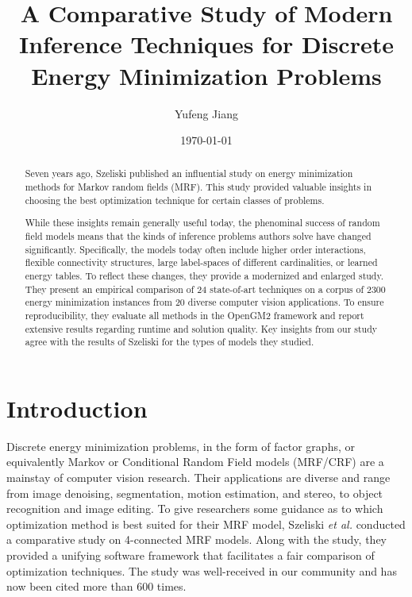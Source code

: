 \documentclass[10pt,twocolumn,letterpaper]{article}
\begin{document}
\title{A Comparative Study of Modern Inference Techniques for Discrete Energy Minimization Problems}
\author{Yufeng Jiang}
\date{\today}
\maketitle

\begin{abstract}
Seven years ago, Szeliski published an influential study on energy minimization methods for Markov random fields (MRF). This study provided valuable insights in choosing the best optimization technique for certain classes of problems.

While these insights remain generally useful today, the phenominal success of random field models means that the kinds of inference problems authors solve have changed significantly. Specifically, the models today often include higher order interactions, flexible connectivity structures, large label-spaces of different cardinalities, or learned energy tables. To reflect these changes, they provide a modernized and enlarged study. They present an empirical comparison of 24 state-of-art techniques on a corpus of 2300 energy minimization instances from 20 diverse computer vision applications. To ensure reproducibility, they evaluate all methods in the OpenGM2 framework and report extensive results regarding runtime and solution quality. Key insights from our study agree with the results of Szeliski for the types of models they studied.
\end{abstract}

\section{Introduction}

Discrete energy minimization problems, in the form of factor graphs, or equivalently Markov or Conditional Random Field models (MRF/CRF) are a mainstay of computer vision research. Their applications are diverse and range from image denoising, segmentation, motion estimation, and stereo, to object recognition and image editing. To give researchers some guidance as to which optimization method is best suited for their MRF model, Szeliski \emph{et al.}\cite{comparative} conducted a comparative study on 4-connected MRF models. Along with the study, they provided a unifying software framework that facilitates a fair comparison of optimization techniques. The study was well-received in our community and has now been cited more than 600 times.
\end{document}
